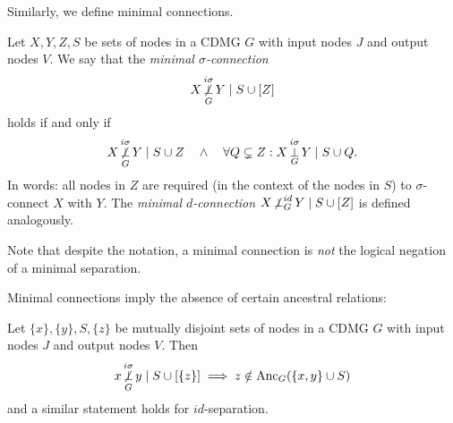 Similarly, we define minimal connections.
\begin{Def}\label{def:min_con}
Let $X,Y,Z,S$ be sets of nodes in a CDMG $G$ with input nodes $J$ and output nodes $V$. 
We say that the \emph{minimal $\sigma$-connection}
  $$X \operatorname*{\not\perp}^{i\sigma}_G Y \mid S \cup [Z]$$
holds if and only if
  $$X \operatorname*{\not\perp}^{i\sigma}_G Y \mid S \cup Z\quad\land\quad \forall Q \subsetneq Z: X \operatorname*{\perp}^{i\sigma}_G Y \mid S \cup Q.$$
In words: all nodes in $Z$ are required (in the context of the nodes in $S$) to $\sigma$-connect $X$ with $Y$.
The \emph{minimal $d$-connection} $X \operatorname*{\not\perp}^{id}_G Y \mid S \cup [Z]$ is defined analogously.
\end{Def}
Note that despite the notation, a minimal connection is \emph{not} the logical negation of a minimal separation.

Minimal connections imply the absence of certain ancestral relations:
\begin{Prp}\label{prp:min_con}
Let $\{x\},\{y\},S,\{z\}$ be mutually disjoint sets of nodes in a CDMG $G$ with input nodes $J$ and output nodes $V$. Then
$$x \operatorname*{\not\perp}^{i\sigma}_G y \mid S \cup [\{z\}] \implies z \notin \mathrm{Anc}_{G}(\{x, y\} \cup S)$$
and a similar statement holds for $id$-separation.
\end{Prp}
